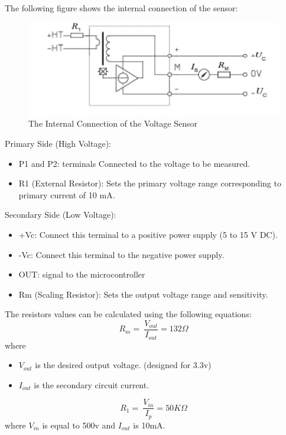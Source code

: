 \documentclass[12pt,a4paper]{book}
\begin{document}
The following figure shows the internal connection of the sensor:
\begin{figure}[h!]
  \centering
  \includegraphics[width = 12cm]{image35.png}
  \caption{The Internal Connection of the Voltage Sensor}
  \label{fig:image35}
\end{figure}

Primary Side (High Voltage):
\begin{itemize}
  \item P1 and P2:  terminals Connected to the voltage to be measured.
  \item R1 (External Resistor): Sets the primary voltage range corresponding to primary current of 10 mA.
\end{itemize}
Secondary Side (Low Voltage):
\begin{itemize}
  \item +Vc: Connect this terminal to a positive power supply (5 to 15 V DC).
  \item -Vc: Connect this terminal to the negative power supply.
  \item	OUT: signal to the microcontroller
  \item	Rm (Scaling Resistor): Sets the output voltage range and sensitivity.
\end{itemize}
The resistors values can be calculated using the following equations:
\begin{equation}
  R_{m} = \ \frac{V_{out}}{I_{out}} = 132\Omega
  \label{equation:eq44}
\end{equation}
where
\begin{itemize}
  \item \(V_{out}\) is the desired output voltage. (designed for 3.3v)
  \item \(I_{out}\) is the secondary circuit current.
\end{itemize}
\begin{equation}
  R_{1} = \ \frac{V_{in}}{I_{p}} = 50K\Omega
  \label{equation:eq45}
\end{equation}
where \(V_{in}\) is equal to 500v and \(I_{out}\) is 10mA.
\end{document}
